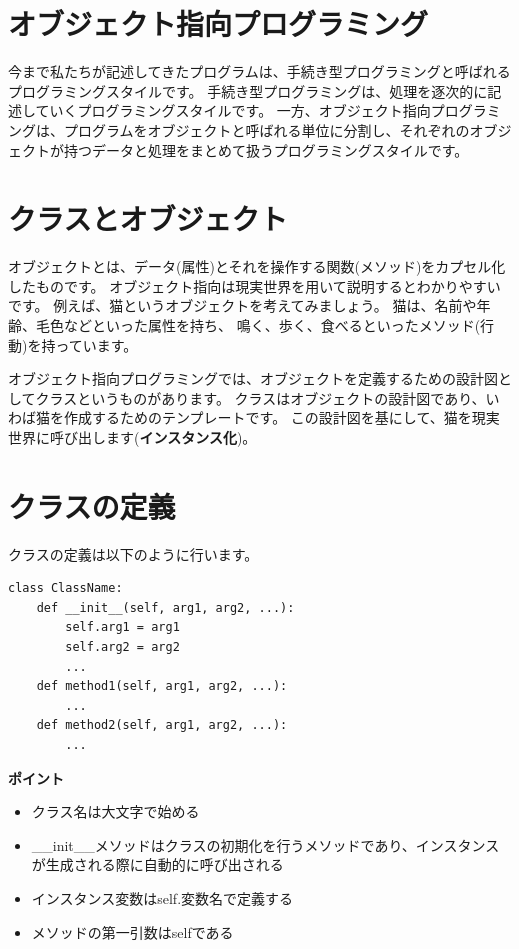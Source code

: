 \documentclass[a4paper,titlepage,dvipdfmx]{jarticle}
\begin{document}
\section{オブジェクト指向プログラミング}
今まで私たちが記述してきたプログラムは、手続き型プログラミングと呼ばれるプログラミングスタイルです。
手続き型プログラミングは、処理を逐次的に記述していくプログラミングスタイルです。
一方、オブジェクト指向プログラミングは、プログラムをオブジェクトと呼ばれる単位に分割し、それぞれのオブジェクトが持つデータと処理をまとめて扱うプログラミングスタイルです。

\section{クラスとオブジェクト}
オブジェクトとは、データ(属性)とそれを操作する関数(メソッド)をカプセル化したものです。
オブジェクト指向は現実世界を用いて説明するとわかりやすいです。
例えば、猫というオブジェクトを考えてみましょう。
猫は、名前や年齢、毛色などといった属性を持ち、
鳴く、歩く、食べるといったメソッド(行動)を持っています。

オブジェクト指向プログラミングでは、オブジェクトを定義するための設計図としてクラスというものがあります。
クラスはオブジェクトの設計図であり、いわば猫を作成するためのテンプレートです。
この設計図を基にして、猫を現実世界に呼び出します(\textbf{インスタンス化})。

\section{クラスの定義}
クラスの定義は以下のように行います。
\begin{lstlisting}[caption=クラスの定義,label=class]
class ClassName:
    def __init__(self, arg1, arg2, ...):
        self.arg1 = arg1
        self.arg2 = arg2
        ...
    def method1(self, arg1, arg2, ...):
        ...
    def method2(self, arg1, arg2, ...):
        ...
\end{lstlisting}

\begin{itembox}[l]{\textbf{ポイント}}
  \begin{itemize}
    \item クラス名は大文字で始める
    \item \_\_init\_\_メソッドはクラスの初期化を行うメソッドであり、インスタンスが生成される際に自動的に呼び出される
    \item インスタンス変数はself.変数名で定義する
    \item メソッドの第一引数はselfである
  \end{itemize}
\end{itembox}
\end{document}
